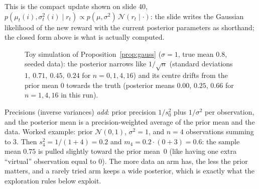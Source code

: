 \documentclass[11pt,a4paper]{article}
\newcommand{\Norm}{\mathcal{N}}
\theoremstyle{plain}
\theoremstyle{definition}
\theoremstyle{remark}
\begin{document}
This is the compact update shown on slide 40, $p(\mu_t(i),\sigma_t^2(i)\mid r_t)\propto p(\mu,\sigma^2)\,\Norm(r_t\mid\cdot)$: the slide writes the Gaussian likelihood of the new reward with the current posterior parameters as shorthand; the closed form above is what is actually computed.

\begin{figure}[ht]
\centering
{}
\caption{Toy simulation of Proposition~\ref{prop:gauss} ($\sigma=1$, true mean $0.8$, seeded data): the posterior narrows like $1/\sqrt n$ (standard deviations $1,\ 0.71,\ 0.45,\ 0.24$ for $n=0,1,4,16$) and its centre drifts from the prior mean $0$ towards the truth
(posterior means $0.00$, $0.25$, $0.66$ for $n=1,4,16$ in this run).}
\end{figure}

\begin{intuition}
Precisions (inverse variances) \emph{add}: prior precision $1/s_0^2$ plus $1/\sigma^2$ per observation, and the posterior mean is a precision-weighted average of the prior mean and the data.
Worked example: prior $\Norm(0,1)$, $\sigma^2=1$, and $n=4$ observations summing to $3$. Then $s_4^2=1/(1+4)=0.2$ and $m_4=0.2\cdot(0+3)=0.6$: the sample mean $0.75$ is pulled slightly toward the prior mean~$0$ (like having one extra ``virtual'' observation equal to $0$).
The more data an arm has, the less the prior matters, and a rarely tried arm keeps a wide posterior, which is exactly what the exploration rules below exploit.
\end{intuition}
\end{document}
